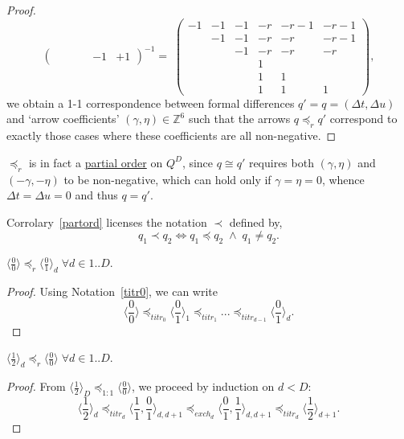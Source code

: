 \documentclass{article}
\begin{document}
\begin{proof}
$$\begin{pmatrix}
       &    &    &    & -1 & +1
  \end{pmatrix}^{-1} =\;
  \begin{pmatrix}
    -1 & -1 & -1 & -r & -r-1 & -r-1 \\
       & -1 & -1 & -r & -r   & -r-1 \\
       &    & -1 & -r & -r   & -r \\
       &    &    &  1 &      &    \\
       &    &    &  1 &  1   &    \\
       &    &    &  1 &  1   &  1
  \end{pmatrix},
  $$
  we obtain a 1-1 correspondence between formal differences $q' = q = (\Delta t,\Delta u)$ and `arrow coefficients' $(\gamma,\eta) \in \mathbb{Z}^6$ such that the arrows $q \preceq_r q'$ correspond to exactly those cases where these coefficients are all non-negative.
\end{proof}

\begin{corr}\label{partord}
  $\preceq_r$ is in fact a \underline{partial order} on $Q^D$, since $q \cong q'$ requires both $(\gamma,\eta)$ and $(-\gamma,-\eta)$ to be non-negative, which can hold only if $\gamma = \eta = 0$, whence $\Delta t = \Delta u = 0$ and thus $q = q'$.
\end{corr}

\begin{nota}
  Corrolary~\ref{partord} licenses the notation $\prec$ defined by,
  $$
  q_1 \prec q_2 \iff q_1 \preceq q_2 \;\wedge\; q_1 \neq q_2.
  $$
\end{nota}

\begin{fact}\label{tol_d}
  $\langle\frac{0}{0}\rangle \preceq_r \langle\frac{0}{1}\rangle_d \;\forall d\in 1..D$.
\end{fact}
\begin{proof}
  Using Notation~\ref{titr0}, we can write
  $$
  \langle\frac{0}{0}\rangle \preceq_{titr_0} \langle\frac{0}{1}\rangle_1 \preceq_{titr_1} ...  \preceq_{titr_{d-1}} \langle\frac{0}{1}\rangle_d.
  $$
\end{proof}

\begin{fact}\label{d11}
  $\langle\frac{1}{2}\rangle_d \preceq_r \langle\frac{0}{0}\rangle \;\forall d\in 1..D$.
\end{fact}
\begin{proof}
  From $\langle\frac{1}{2}\rangle_D \preceq_{1:1} \langle\frac{0}{0}\rangle$, we proceed by induction on $d<D$:
  $$
  \langle\frac{1}{2}\rangle_d \preceq_{titr_d} \langle\frac{1}{1},\frac{0}{1}\rangle_{d,d+1} \preceq_{exch_d} \langle\frac{0}{1},\frac{1}{1}\rangle_{d,d+1} \preceq_{titr_d} \langle\frac{1}{2}\rangle_{d+1}.
  $$
\end{proof}
\end{document}
